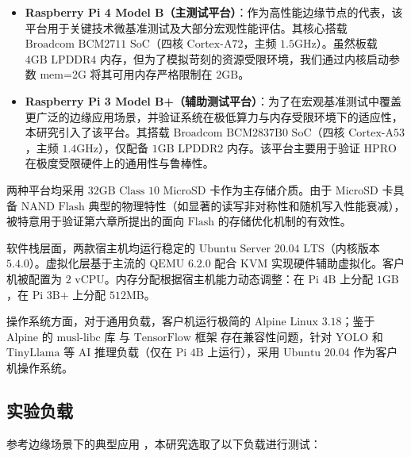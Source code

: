 \begin{itemize}
  \item \textbf{Raspberry Pi 4 Model B（主测试平台）}：作为高性能边缘节点的代表，该平台用于关键技术微基准测试及大部分宏观性能评估。其核心搭载 $\text{Broadcom BCM2711 SoC}$（四核 $\text{Cortex-A72}$，主频 $\text{1.5GHz}$）。虽然板载 $\text{4GB LPDDR4}$ 内存，但为了模拟苛刻的资源受限环境，我们通过内核启动参数 mem=2G 将其可用内存严格限制在 $\text{2GB}$。
  \item \textbf{Raspberry Pi 3 Model B+（辅助测试平台）}：为了在宏观基准测试中覆盖更广泛的边缘应用场景，并验证系统在极低算力与内存受限环境下的适应性，本研究引入了该平台。其搭载 $\text{Broadcom BCM2837B0 SoC}$（四核 $\text{Cortex-A53}$，主频 $\text{1.4GHz}$），仅配备 $\text{1GB LPDDR2}$ 内存。该平台主要用于验证 $\text{HPRO}$ 在极度受限硬件上的通用性与鲁棒性。
\end{itemize}

两种平台均采用 $\text{32GB Class 10 MicroSD}$ 卡作为主存储介质。由于 $\text{MicroSD}$ 卡具备 $\text{NAND Flash}$ 典型的物理特性（如显著的读写非对称性和随机写入性能衰减），被特意用于验证第六章所提出的面向 $\text{Flash}$ 的存储优化机制的有效性。

软件栈层面，两款宿主机均运行稳定的 $\text{Ubuntu Server 20.04 LTS}$（内核版本 $\text{5.4.0}$）。虚拟化层基于主流的 $\text{QEMU 6.2.0}$ 配合 $\text{KVM}$ 实现硬件辅助虚拟化。客户机被配置为 $\text{2 vCPU}$。内存分配根据宿主机能力动态调整：在 $\text{Pi 4B}$ 上分配 $\text{1GB}$，在 $\text{Pi 3B+}$ 上分配 $\text{512MB}$。

操作系统方面，对于通用负载，客户机运行极简的 $\text{Alpine Linux 3.18}$\cite{alpine_linux}；鉴于 $\text{Alpine}$ 的 $\text{musl-libc}$ 库\cite{musl_libc} 与 $\text{TensorFlow}$ 框架\cite{tensorflow} 存在兼容性问题，针对 $\text{YOLO}$ 和 $\text{TinyLlama}$ 等 $\text{AI}$ 推理负载（仅在 $\text{Pi 4B}$ 上运行），采用 $\text{Ubuntu 20.04}$ 作为客户机操作系统。

\subsection{实验负载}

参考边缘场景下的典型应用 ，本研究选取了以下负载进行测试：

